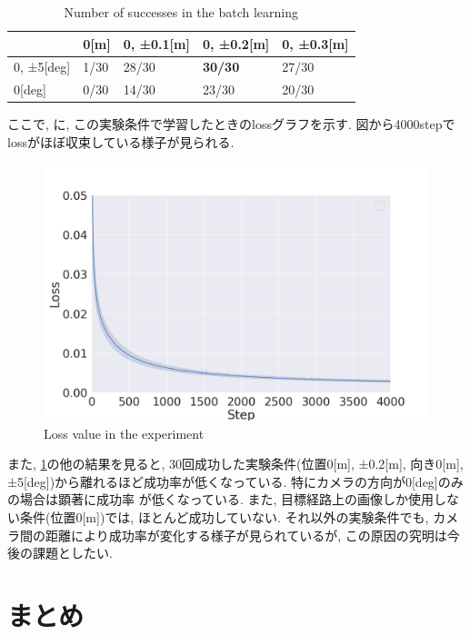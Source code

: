 \begin{table}[h]
  \centering
  \caption{Number of successes in the batch learning}
  \begin{tabular}{|p{2cm}|p{2cm}|p{2cm}|p{2cm}|p{2cm}|} \hline
     & 0[m] & 0, ±0.1[m] & 0, ±0.2[m] & 0, ±0.3[m] \\ \hline
    0, ±5[deg] & 1/30 & 28/30 & \bf30/30 & 27/30 \\ \hline
    0[deg] & 0/30 & 14/30 & 23/30 & 20/30 \\ \hline
  \end{tabular}
  \label{tb:exp1}
\end{table}

ここで, に, この実験条件で学習したときのlossグラフを示す. 図から4000stepでlossがほぼ収束している様子が見られる. 

\newpage
\begin{figure}[h]
  \centering
  \includegraphics[keepaspectratio, scale=0.35]{images/loss_00_02_4000.png}
  \caption{Loss value in the experiment}
  \label{Fig:loss_00_02_4000}
  \end{figure}

また, \ref{tb:exp1}の他の結果を見ると, 30回成功した実験条件(位置0[m], ±0.2[m], 向き0[m], ±5[deg])から離れるほど成功率が低くなっている. 特にカメラの方向が0[deg]のみの場合は顕著に成功率
が低くなっている. また, 目標経路上の画像しか使用しない条件(位置0[m])では, ほとんど成功していない. それ以外の実験条件でも, カメラ間の距離により成功率が変化する様子が見られているが, この原因の究明は今後の課題としたい. 

\section{まとめ}